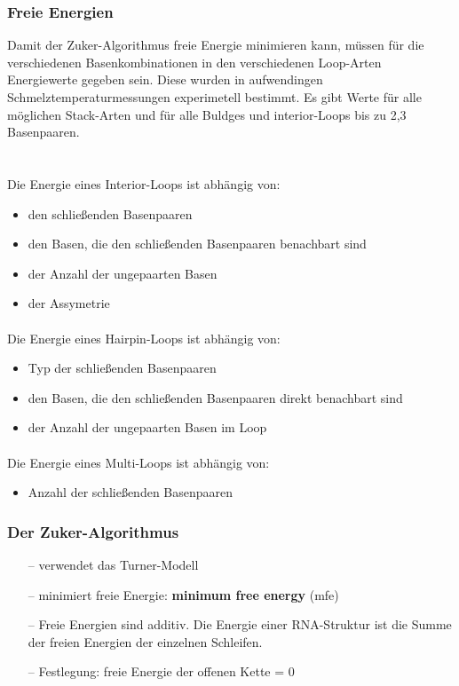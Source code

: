 \subsubsection{Freie Energien}
Damit der Zuker-Algorithmus freie Energie minimieren kann, m\"ussen f\"ur die verschiedenen Basenkombinationen in den verschiedenen Loop-Arten Energiewerte gegeben sein. Diese wurden in aufwendingen Schmelztemperaturmessungen experimetell bestimmt. Es gibt Werte für alle m\"oglichen Stack-Arten und f\"ur alle Buldges und interior-Loops bis zu 2,3 Basenpaaren.\\\\
\paragraph{}
Die Energie eines Interior-Loops ist abh\"angig von:
\begin{itemize}
	\item den schließenden Basenpaaren
	\item den Basen, die den schließenden Basenpaaren benachbart sind
	\item der Anzahl der ungepaarten Basen
	\item der Assymetrie
\end{itemize}
\paragraph{}
Die Energie eines Hairpin-Loops ist abh\"angig von:
\begin{itemize}
	\item Typ der schließenden Basenpaaren
	\item den Basen, die den schließenden Basenpaaren direkt benachbart sind
	\item der Anzahl der ungepaarten Basen im Loop
\end{itemize}
\paragraph{}
Die Energie eines Multi-Loops ist abh\"angig von:
\begin{itemize}
	\item Anzahl der schließenden Basenpaaren
\end{itemize}

\subsubsection{Der Zuker-Algorithmus}
\begin{itemize}
\item[--]verwendet das Turner-Modell
\item[--]minimiert freie Energie: \textbf{minimum free energy} (mfe)
\item[--]Freie Energien sind additiv. Die Energie einer RNA-Struktur ist die Summe der freien Energien der einzelnen Schleifen.
\item[--]Festlegung: freie Energie der offenen Kette = 0
\end{itemize}
